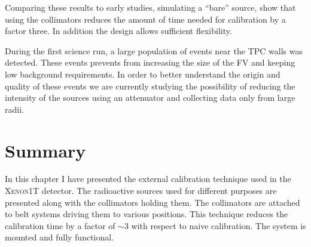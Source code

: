 Comparing these results to early studies, simulating a ``bare'' source, show that using the collimators reduces the amount of time needed for calibration by a factor three. In addition the design allows sufficient flexibility.

During the first science run, a large population of events near the TPC walls was detected. These events prevents from increasing the size of the FV and keeping low background requirements. In order to better understand the origin and quality of these events we are currently studying the possibility of reducing the intensity of the sources using an attenuator and collecting data only from large radii.  

\section{Summary}

In this chapter I have presented the external calibration technique used in the \textsc{Xenon1T} detector. The radioactive sources used for different purposes are presented along with the collimators holding them. The collimators are attached to belt systems driving them to various positions. This technique reduces the calibration time by a factor of $\sim3$ with respect to naive calibration. The system is mounted and fully functional.   
